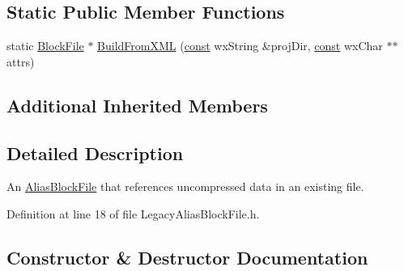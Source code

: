 \subsection*{Static Public Member Functions}
\begin{DoxyCompactItemize}
\item 
static \hyperlink{class_block_file}{Block\+File} $\ast$ \hyperlink{class_legacy_alias_block_file_a46703b3000db88d305cddd3fd79ce9da}{Build\+From\+X\+ML} (\hyperlink{getopt1_8c_a2c212835823e3c54a8ab6d95c652660e}{const} wx\+String \&proj\+Dir, \hyperlink{getopt1_8c_a2c212835823e3c54a8ab6d95c652660e}{const} wx\+Char $\ast$$\ast$attrs)
\end{DoxyCompactItemize}
\subsection*{Additional Inherited Members}


\subsection{Detailed Description}
An \hyperlink{class_alias_block_file}{Alias\+Block\+File} that references uncompressed data in an existing file. 

Definition at line 18 of file Legacy\+Alias\+Block\+File.\+h.



\subsection{Constructor \& Destructor Documentation}

